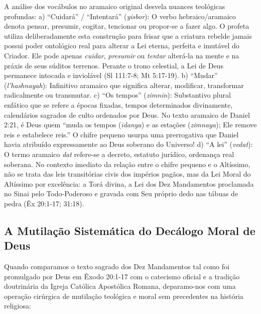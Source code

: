 A análise dos vocábulos no aramaico original desvela nuances teológicas profundas:
a) ``Cuidará'' / ``Intentará'' (\textit{yisbor}): O verbo hebraico/aramaico denota pensar, presumir, cogitar, tencionar ou propor-se a fazer algo. O profeta utiliza deliberadamente esta construção para frisar que a criatura rebelde jamais possui poder ontológico real para alterar a Lei eterna, perfeita e imutável do Criador. Ele pode apenas \textit{cuidar}, \textit{presumir} ou \textit{tentar} alterá-la na mente e na práxis de seus súditos terrenos. Perante o trono celestial, a Lei de Deus permanece intocada e inviolável (Sl 111:7-8; Mt 5:17-19).
b) ``Mudar'' (\textit{l'hashnayah}): Infinitivo aramaico que significa alterar, modificar, transformar radicalmente ou transmutar.
c) ``Os tempos'' (\textit{zimnin}): Substantivo plural enfático que se refere a épocas fixadas, tempos determinados divinamente, calendários sagrados de culto ordenados por Deus. No texto aramaico de Daniel 2:21, é Deus quem ``muda os tempos (\textit{idanya}) e as estações (\textit{zimnaya}); Ele remove reis e estabelece reis.'' O chifre pequeno usurpa uma prerrogativa que Daniel havia atribuído expressamente ao Deus soberano do Universo!
d) ``A lei'' (\textit{vedat}): O termo aramaico \textit{dat} refere-se a decreto, estatuto jurídico, ordenança real soberana. No contexto imediato da relação entre o chifre pequeno e o Altíssimo, não se trata das leis transitórias civis dos impérios pagãos, mas da Lei Moral do Altíssimo por excelência: a Torá divina, a Lei dos Dez Mandamentos proclamada no Sinai pelo Todo-Poderoso e gravada com Seu próprio dedo nas tábuas de pedra (Êx 20:1-17; 31:18).



\subsection{A Mutilação Sistemática do Decálogo Moral de Deus}


Quando comparamos o texto sagrado dos Dez Mandamentos tal como foi promulgado por Deus em Êxodo 20:1-17 com o catecismo oficial e a tradição doutrinária da Igreja Católica Apostólica Romana, deparamo-nos com uma operação cirúrgica de mutilação teológica e moral sem precedentes na história religiosa:


